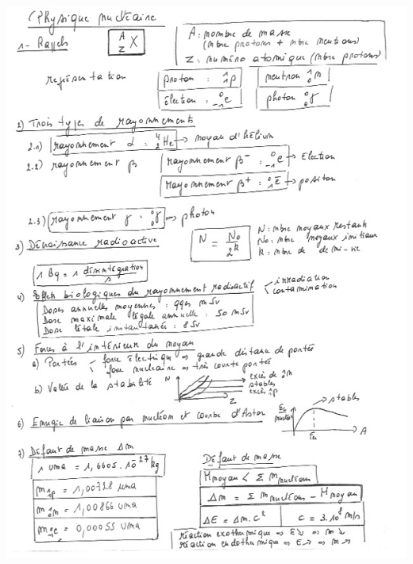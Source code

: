 \includegraphics[width=19.473cm,height=26.859cm]{Pictures/1000000100000262000003488C6E86B2411A3EA3.png}

